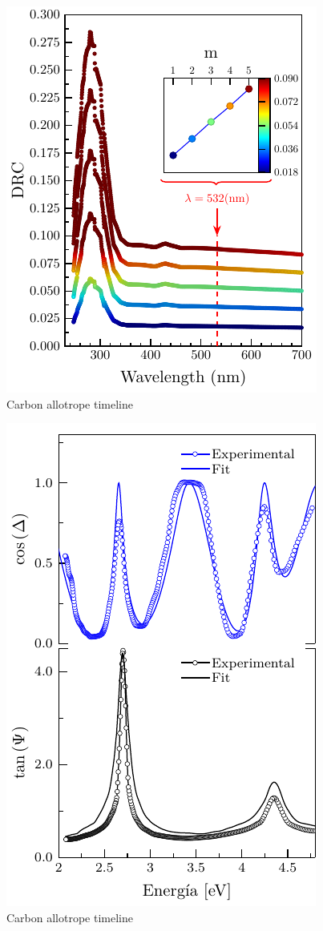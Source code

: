 \begin{figure}
	\centering
	\includegraphics[width=0.75\linewidth]{FIGURES/Experimental_results/image01.pdf}
	\caption{Carbon allotrope timeline}
	\label{fig:DRD}
\end{figure}


\begin{figure}
	\centering
	\includegraphics[width=0.75\linewidth]{FIGURES/Experimental_results/Psi_Delta-2.pdf}
	\caption{Carbon allotrope timeline}
	\label{fig:ajusteSiO}
\end{figure}



